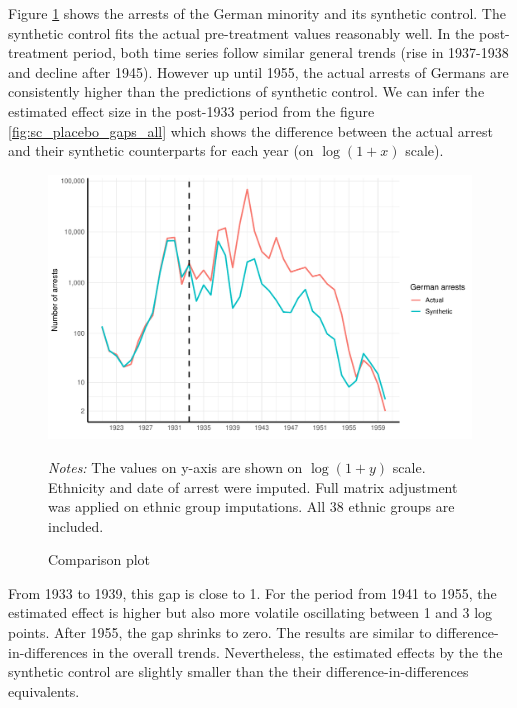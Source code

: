 %


Figure \ref{fig:sc_comp_plot} shows the  arrests of the German minority and its synthetic control.
The synthetic control fits the actual pre-treatment values reasonably well. 
In the post-treatment period, both time series follow similar general trends (rise in 1937-1938 and decline after 1945). 
However up until 1955, the actual arrests of Germans are consistently higher than the predictions of  synthetic control. %
We can infer the estimated effect size in the post-1933 period  from 
the figure  \ref{fig:sc_placebo_gaps_all} which shows the difference between the actual arrest and their synthetic counterparts for each year (on $\log(1 + x)$ scale). 

 \begin{figure}[h]
\centering
\caption{Comparison plot}
\includegraphics[width=\textwidth]{plots/synthetic_control/ethnicity_imputation/annual/comparison_plot_scaled.pdf}
\begin{minipage}{0.92\textwidth}
\footnotesize
\emph{Notes:} The values on y-axis are shown on $\log\left(1 + y\right)$ scale.  Ethnicity and date of arrest were imputed.  Full matrix adjustment was applied on ethnic group imputations. All 38 ethnic groups are included. 
\end{minipage}
\label{fig:sc_comp_plot}
\end{figure}


From 1933 to 1939, this gap is close to 1. For the period from 1941 to 1955, the estimated effect is higher but also more volatile oscillating between 1 and 3 log points.
After 1955, the gap shrinks to zero. 
The results are similar to difference-in-differences in the overall trends. Nevertheless, the estimated effects by the  the synthetic control  are slightly smaller than the their difference-in-differences equivalents.  

